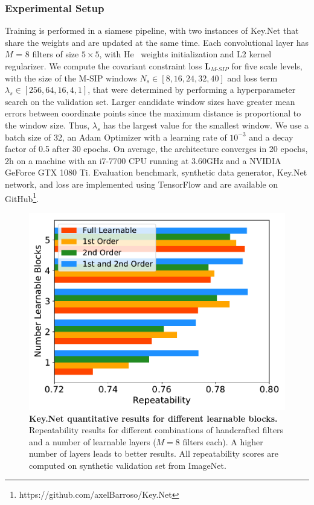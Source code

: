 \subsubsection{Experimental Setup}
\label{subsec:Implementation_Details}
Training is performed in a siamese pipeline, with two instances of Key.Net that share the weights and are updated at the same time. Each convolutional layer has $M$ = 8 filters of size $5 \times 5$, with He~\cite{HE_initializatio} weights initialization and L2 kernel regularizer. We compute the covariant constraint loss $\mathbf{L}_{M\mbox{-}SIP}$ for five scale levels, with the size of the M-SIP windows $N_s \in [8, 16, 24, 32, 40]$ and loss term $\lambda_s \in [256, 64, 16, 4, 1]$, that were determined by performing a hyperparameter search on the validation set. Larger candidate window sizes have greater mean errors between coordinate points since the maximum distance is proportional to the window size. Thus, $\lambda_s$ has the largest value for the smallest window. We use a batch size of 32, an Adam Optimizer with a learning rate of $10^{-3}$ and a decay factor of 0.5 after 30 epochs. On average, the architecture converges in 20 epochs, 2h on a machine with an i7-7700 CPU running at 3.60GHz and a NVIDIA GeForce GTX 1080 Ti. Evaluation benchmark, synthetic data generator, Key.Net network, and loss are implemented using TensorFlow and are available on GitHub\footnote{https://github.com/axelBarroso/Key.Net}. 


\begin{figure}
\vspace{-0.10cm}
    \centering
    \includegraphics[width=0.65\linewidth]{main/chapter02/figures/learnable_blocks.pdf}
\caption[Key.Net quantitative results for different learnable blocks]{\textbf{Key.Net quantitative results for different learnable blocks.} Repeatability results for different combinations of handcrafted filters and a number of learnable layers ($M=8$ filters each). A higher number of layers leads to better results. All repeatability scores are computed on synthetic validation set from ImageNet.}
\label{fig:keynet_learnableblocks}
\end{figure}


